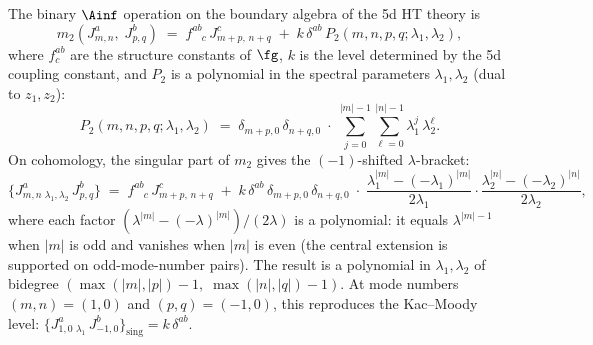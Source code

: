 \begin{theorem}
\label{thm:DDCA-m2}
The binary $\Ainf$ operation on the boundary algebra of
the 5d HT theory is
\begin{equation}\label{eq:DDCA-m2}
 m_2(J^a_{m,n},\; J^b_{p,q})
 \;=\;
 f^{ab}_{\phantom{ab}c}\, J^c_{m+p,\,n+q}
 \;+\;
 k\,\delta^{ab}\,
 P_2(m,n,p,q;\lambda_1,\lambda_2),
\end{equation}
where $f^{ab}_c$ are the structure constants of $\fg$,
$k$ is the level determined by the 5d coupling constant,
and $P_2$ is a polynomial in the spectral parameters
$\lambda_1,\lambda_2$ (dual to $z_1,z_2$):
\begin{equation}\label{eq:DDCA-central-term}
 P_2(m,n,p,q;\lambda_1,\lambda_2)
 \;=\;
 \delta_{m+p,0}\,\delta_{n+q,0}
 \;\cdot\;
 \sum_{j=0}^{|m|-1}
 \sum_{\ell=0}^{|n|-1}
 \lambda_1^{j}\,\lambda_2^{\ell}.
\end{equation}
On cohomology, the singular part of $m_2$ gives the
$(-1)$-shifted $\lambda$-bracket:
\begin{equation}\label{eq:DDCA-bracket}
 \{J^a_{m,n}\,{}_{\lambda_1,\lambda_2}\, J^b_{p,q}\}
 \;=\;
 f^{ab}_{\phantom{ab}c}\, J^c_{m+p,\,n+q}
 \;+\;
 k\,\delta^{ab}\,\delta_{m+p,0}\,\delta_{n+q,0}
 \;\cdot\;
 \frac{\lambda_1^{|m|} - (-\lambda_1)^{|m|}}
 {2\lambda_1}
 \cdot
 \frac{\lambda_2^{|n|} - (-\lambda_2)^{|n|}}
 {2\lambda_2},
\end{equation}
where each factor $(\lambda^{|m|} - (-\lambda)^{|m|})/(2\lambda)$
is a polynomial: it equals $\lambda^{|m|-1}$ when $|m|$ is odd
and vanishes when $|m|$ is even (the central extension
is supported on odd-mode-number pairs).
The result is a polynomial in $\lambda_1,\lambda_2$ of bidegree
$(\max(|m|,|p|)-1,\;\max(|n|,|q|)-1)$. At mode
numbers $(m,n) = (1,0)$ and $(p,q) = (-1,0)$, this
reproduces the Kac--Moody level:
$\{J^a_{1,0}\,{}_{\lambda_1}\, J^b_{-1,0}\}_{\mathrm{sing}}
= k\,\delta^{ab}$.
\end{theorem}

